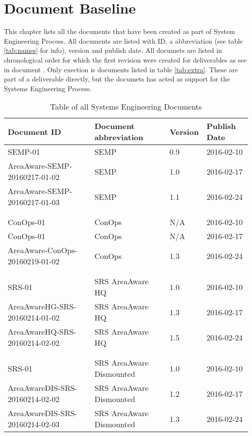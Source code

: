 %
\thispagestyle{fancy}
\chapter{Document Baseline}
\label{chp:baseline}
This chapter lists all the documents that have been created as part of System Engineering Process.
All documents are listed with ID, a abbreviation (see table \ref{tab:names} for info), version and publish date.
All documets are listed in chronological order for which the first revision were created for deliverables as see in document \semp.
Only exection is documents listed in table \ref{tab:extra}. These are part of a deliverable directly, but the documets has acted as support for the Systems Engineering Process.


\begin{table}[h]
    \centering
    \label{tab:baseline1}
    \begin{tabular}{llll}
    \textbf{Document ID} & \textbf{Document abbreviation} & \textbf{Version} & \textbf{Publish Date} \\ \hline
    SEMP-01 & SEMP & 0.9 & 2016-02-10 \\ \hline
    AreaAware-SEMP-20160217-01-02 & SEMP & 1.0 & 2016-02-17 \\ \hline
    AreaAware-SEMP-20160217-01-03 & SEMP & 1.1 & 2016-02-24 \\ \hline
    &  &  &  \\
    &  &  &  \\
    ConOps-01 & ConOps & N/A & 2016-02-10 \\ \hline
    ConOps-01 & ConOps & N/A & 2016-02-17\\ \hline
    AreaAware-ConOps-20160219-01-02 & ConOps & 1.3 & 2016-02-24\\ \hline
    &  &  &  \\
    &  &  &  \\
    SRS-01 & SRS AreaAware HQ & 1.0 & 2016-02-10 \\ \hline
    AreaAwareHG-SRS-20160214-01-02 & SRS AreaAware HQ & 1.3 & 2016-02-17 \\ \hline
    AreaAwareHQ-SRS-20160214-02-02 & SRS AreaAware HQ & 1.5 & 2016-02-24 \\ \hline
    &  &  &  \\
    &  &  &  \\
    SRS-01 & SRS AreaAware Dismounted & 1.0 & 2016-02-10 \\ \hline
    AreaAwareDIS-SRS-20160214-02-02 & SRS AreaAware Dismounted & 1.2 & 2016-02-17 \\ \hline
    AreaAwareDIS-SRS-20160214-02-03 & SRS AreaAware Dismounted & 1.3 & 2016-02-24 \\ \hline
    \end{tabular}
    \caption{Table of all Systems Engineering Documents}
\end{table}


